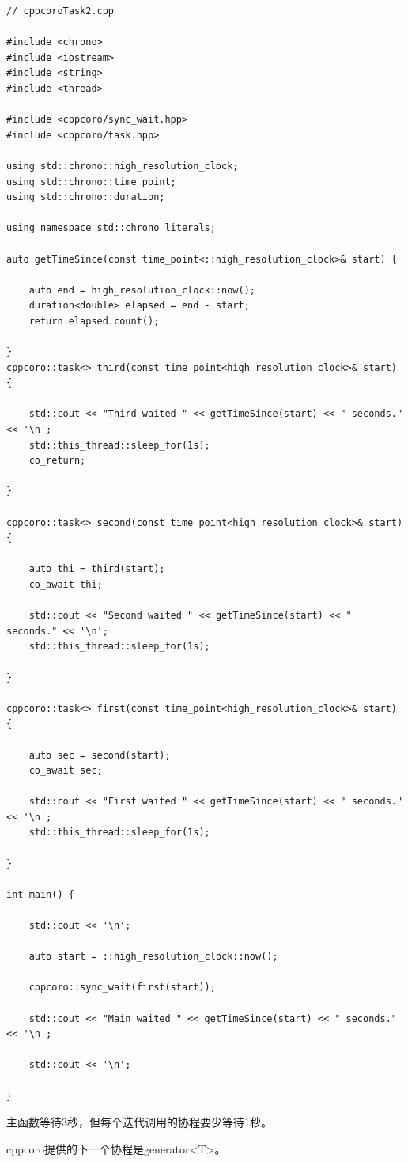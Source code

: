 \begin{lstlisting}[style=styleCXX]
// cppcoroTask2.cpp

#include <chrono>
#include <iostream>
#include <string>
#include <thread>

#include <cppcoro/sync_wait.hpp>
#include <cppcoro/task.hpp>

using std::chrono::high_resolution_clock;
using std::chrono::time_point;
using std::chrono::duration;

using namespace std::chrono_literals;

auto getTimeSince(const time_point<::high_resolution_clock>& start) {

	auto end = high_resolution_clock::now();
	duration<double> elapsed = end - start;
	return elapsed.count();

}
cppcoro::task<> third(const time_point<high_resolution_clock>& start) {

	std::cout << "Third waited " << getTimeSince(start) << " seconds." << '\n';
	std::this_thread::sleep_for(1s);
	co_return;

}

cppcoro::task<> second(const time_point<high_resolution_clock>& start) {

	auto thi = third(start);
	co_await thi;
	
	std::cout << "Second waited " << getTimeSince(start) << " seconds." << '\n';
	std::this_thread::sleep_for(1s);

}

cppcoro::task<> first(const time_point<high_resolution_clock>& start) {

	auto sec = second(start);
	co_await sec;
	
	std::cout << "First waited " << getTimeSince(start) << " seconds." << '\n';
	std::this_thread::sleep_for(1s);

}

int main() {

	std::cout << '\n';
	
	auto start = ::high_resolution_clock::now();
	
	cppcoro::sync_wait(first(start));
	
	std::cout << "Main waited " << getTimeSince(start) << " seconds." << '\n';
	
	std::cout << '\n';

}
\end{lstlisting}

主函数等待3秒，但每个迭代调用的协程要少等待1秒。

cppcoro提供的下一个协程是generator<T>。

